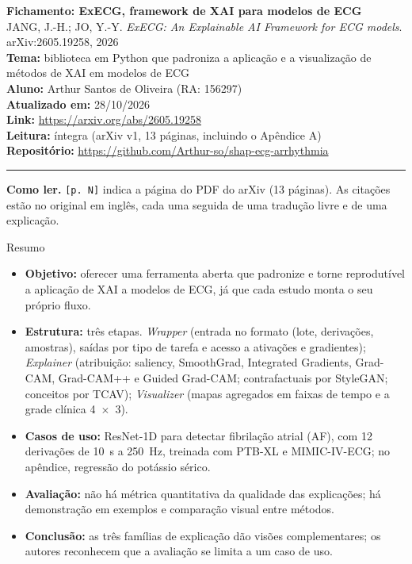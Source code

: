 \documentclass[11pt,a4paper]{article}
\begin{document}
\sloppy

\begin{center}
    {\LARGE \textbf{Fichamento: ExECG, framework de XAI para modelos de ECG}} \\[0.35em]
    {\large JANG, J.-H.; JO, Y.-Y. \textit{ExECG: An Explainable AI Framework for ECG models}. arXiv:2605.19258, 2026} \\[0.3em]
    \textbf{Tema:} biblioteca em Python que padroniza a aplicação e a visualização de métodos de XAI em modelos de ECG \\[0.2em]
    \textbf{Aluno:} Arthur Santos de Oliveira (RA: 156297) \\[0.2em]
    \textbf{Atualizado em:} 28/10/2026 \\[0.2em]
    \textbf{Link:} \url{https://arxiv.org/abs/2605.19258} \\[0.2em]
    \textbf{Leitura:} íntegra (arXiv v1, 13 páginas, incluindo o Apêndice A) \\[0.2em]
    \textbf{Repositório:} \url{https://github.com/Arthur-so/shap-ecg-arrhythmia}
\end{center}
\vspace{-0.5em}
\hrule
\vspace{0.8em}

\textbf{Como ler.} \texttt{[p. N]} indica a página do PDF do arXiv (13 páginas). As citações estão no original em inglês, cada uma seguida de uma tradução livre e de uma explicação.

\begin{infobox}[note]{Resumo}
\begin{itemize}
\item \textbf{Objetivo:} oferecer uma ferramenta aberta que padronize e torne reprodutível a aplicação de XAI a modelos de ECG, já que cada estudo monta o seu próprio fluxo.
\item \textbf{Estrutura:} três etapas. \textit{Wrapper} (entrada no formato (lote, derivações, amostras), saídas por tipo de tarefa e acesso a ativações e gradientes); \textit{Explainer} (atribuição: saliency, SmoothGrad, Integrated Gradients, Grad-CAM, Grad-CAM++ e Guided Grad-CAM; contrafactuais por StyleGAN; conceitos por TCAV); \textit{Visualizer} (mapas agregados em faixas de tempo e a grade clínica 4~$\times$~3).
\item \textbf{Casos de uso:} ResNet-1D para detectar fibrilação atrial (AF), com 12 derivações de 10~s a 250~Hz, treinada com PTB-XL e MIMIC-IV-ECG; no apêndice, regressão do potássio sérico.
\item \textbf{Avaliação:} não há métrica quantitativa da qualidade das explicações; há demonstração em exemplos e comparação visual entre métodos.
\item \textbf{Conclusão:} as três famílias de explicação dão visões complementares; os autores reconhecem que a avaliação se limita a um caso de uso.
\end{itemize}
\end{infobox}
\end{document}
